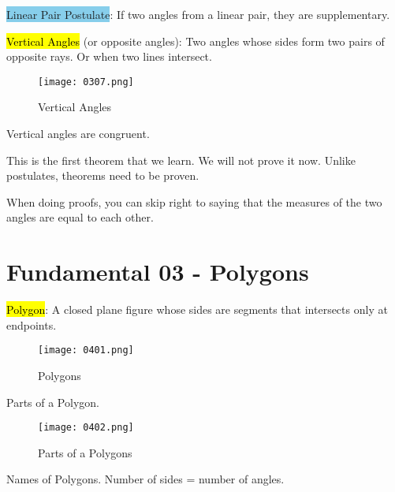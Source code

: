 \begin{tcolorbox}[colback=RoyalPurple!5!white,colframe=RoyalPurple!75!black]
  \colorbox{SkyBlue}{Linear Pair Postulate}: If two angles from a linear pair, they are supplementary.
\end{tcolorbox}

\vspace{1 cm}

\hl{Vertical Angles} (or opposite angles): Two angles whose sides form two pairs of opposite rays. Or when two lines intersect.

\begin{figure}[htb!]
  \centering
  \texttt{[image: 0307.png]}
  \caption{Vertical Angles}
\end{figure}

\begin{tcolorbox}[colback=red!5!white,colframe=red!75!black,title=Vertical Angles Theorem]
  Vertical angles are congruent.
\end{tcolorbox}

This is the first theorem that we learn. We will not prove it now. Unlike postulates, theorems need to be proven.

When doing proofs, you can skip right to saying that the measures of the two angles are equal to each other.

\section{Fundamental 03 - Polygons}

\newpage

\hl{Polygon}: A closed plane figure whose sides are segments that intersects only at endpoints.

\begin{figure}[htb!]
  \centering
  \texttt{[image: 0401.png]}
  \caption{Polygons}
\end{figure}

Parts of a Polygon.

\begin{figure}[htb!]
  \centering
  \texttt{[image: 0402.png]}
  \caption{Parts of a Polygons}
\end{figure}

\newpage

Names of Polygons. Number of sides = number of angles.

